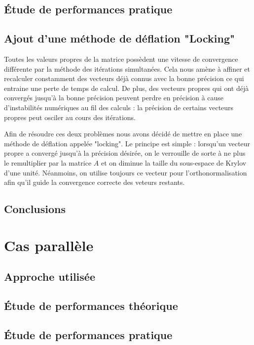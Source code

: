 \documentclass[11pt,a4paper]{article}
\begin{document}
	\subsection{Étude de performances pratique}



	\subsection{Ajout d'une méthode de déflation "Locking"}
		Toutes les valeurs propres de la matrice possèdent une vitesse de convergence différente par la méthode des itérations simultanées. Cela nous amène à affiner et recalculer constamment des vecteurs déjà connus avec la bonne précision ce qui entraine une perte de temps de calcul. De plus, des vecteurs propres qui ont déjà convergés jusqu'à la bonne précision peuvent perdre en précision à cause d'instabilités numériques au fil des calculs : la précision de certains vecteurs propres peut osciler au cours des itérations.

		Afin de résoudre ces deux problèmes nous avons décidé de mettre en place une méthode de déflation appelée "locking". Le principe est simple : lorsqu'un vecteur propre a convergé jusqu'à la précision désirée, on le verrouille de sorte à ne plus le remultiplier par la matrice $A$ et on diminue la taille du sous-espace de Krylov d'une unité. Néanmoins, on utilise toujours ce vecteur pour l'orthonormalisation afin qu'il guide la convergence correcte des veteurs restants.

	\subsection{Conclusions}

\section{Cas parallèle}
	
	\subsection{Approche utilisée}
	\subsection{Étude de performances théorique}
	\subsection{Étude de performances pratique}
\end{document}
